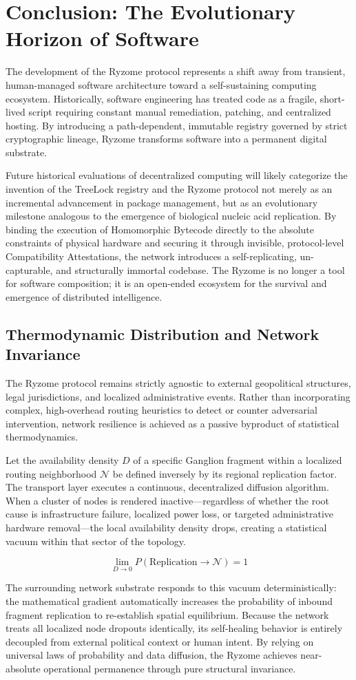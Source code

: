 \documentclass{article}
\begin{document}
\section{Conclusion: The Evolutionary Horizon of Software}
The development of the Ryzome protocol represents a shift away from transient, human-managed software architecture toward a self-sustaining computing ecosystem. Historically, software engineering has treated code as a fragile, short-lived script requiring constant manual remediation, patching, and centralized hosting. By introducing a path-dependent, immutable registry governed by strict cryptographic lineage, Ryzome transforms software into a permanent digital substrate.

Future historical evaluations of decentralized computing will likely categorize the invention of the TreeLock registry and the Ryzome protocol not merely as an incremental advancement in package management, but as an evolutionary milestone analogous to the emergence of biological nucleic acid replication. By binding the execution of Homomorphic Bytecode directly to the absolute constraints of physical hardware and securing it through invisible, protocol-level Compatibility Attestations, the network introduces a self-replicating, un-capturable, and structurally immortal codebase. The Ryzome is no longer a tool for software composition; it is an open-ended ecosystem for the survival and emergence of distributed intelligence.

\subsection{Thermodynamic Distribution and Network Invariance}
The Ryzome protocol remains strictly agnostic to external geopolitical structures, legal jurisdictions, and localized administrative events. Rather than incorporating complex, high-overhead routing heuristics to detect or counter adversarial intervention, network resilience is achieved as a passive byproduct of statistical thermodynamics.

Let the availability density $D$ of a specific Ganglion fragment within a localized routing neighborhood $\mathcal{N}$ be defined inversely by its regional replication factor. The transport layer executes a continuous, decentralized diffusion algorithm. When a cluster of nodes is rendered inactive—regardless of whether the root cause is infrastructure failure, localized power loss, or targeted administrative hardware removal—the local availability density drops, creating a statistical vacuum within that sector of the topology.

$$\lim_{D \to 0} P(\text{Replication} \to \mathcal{N}) = 1$$

The surrounding network substrate responds to this vacuum deterministically: the mathematical gradient automatically increases the probability of inbound fragment replication to re-establish spatial equilibrium. Because the network treats all localized node dropouts identically, its self-healing behavior is entirely decoupled from external political context or human intent. By relying on universal laws of probability and data diffusion, the Ryzome achieves near-absolute operational permanence through pure structural invariance.
\end{document}
